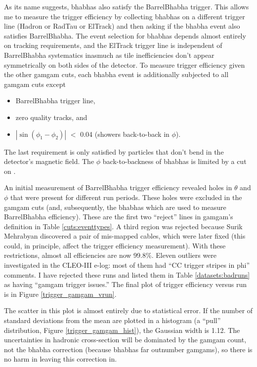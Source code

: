 As its name suggests, bhabhas also satisfy the BarrelBhabha trigger.
This allows me to measure the trigger efficiency by collecting bhabhas
on a different trigger line (Hadron or RadTau or ElTrack) and then
asking if the bhabha event also satisfies BarrelBhabha.  The event
selection for bhabhas depends almost entirely on tracking
requirements, and the ElTrack trigger line is independent of
BarrelBhabha systematics inasmuch as tile inefficiencies don't appear
symmetrically on both sides of the detector.  To measure trigger
efficiency given the other gamgam cuts, each bhabha event is
additionally subjected to all gamgam cuts except
\begin{itemize}
  \item BarrelBhabha trigger line,
  \item zero quality tracks, and
  \item $|\sin(\phi_1 - \phi_2)|$ $<$ 0.04 (showers back-to-back
    in $\phi$).
\end{itemize}
The last requirement is only satisfied by particles that don't bend in
the detector's magnetic field.  The $\phi$ back-to-backness of bhabhas
is limited by a cut on \eisr.

An initial measurement of BarrelBhabha trigger efficiency revealed
holes in $\theta$ and $\phi$ that were present for different run
periods.  These holes were excluded in the gamgam cuts (and,
subsequently, the bhabhas which are used to measure BarrelBhabha
efficiency).  These are the first two ``reject'' lines in gamgam's
definition in Table \ref{cuts:eventtypes}.  A third region was
rejected because Surik Mehrabyan discovered a pair of mis-mapped
cables, which were later fixed (this could, in principle, affect the
trigger efficiency measurement).  With these restrictions, almost all
efficiencies are now 99.8\%.  Eleven outliers were investigated in the
CLEO-III e-log: most of them had ``CC trigger stripes in phi''
comments.  I have rejected these runs and listed them in Table
\ref{datasets:badruns} as having ``gamgam trigger issues.''  The final
plot of trigger efficiency versus run is in Figure
\ref{trigger_gamgam_vrun}.

The scatter in this plot is almost entirely due to statistical error.
If the number of standard deviations from the mean are plotted in a
histogram (a ``pull'' distribution, Figure \ref{trigger_gamgam_hist}),
the Gaussian width is 1.12.  The uncertainties in hadronic
cross-section will be dominated by the gamgam count, not the bhabha
correction (because bhabhas far outnumber gamgams), so there is no
harm in leaving this correction in.

